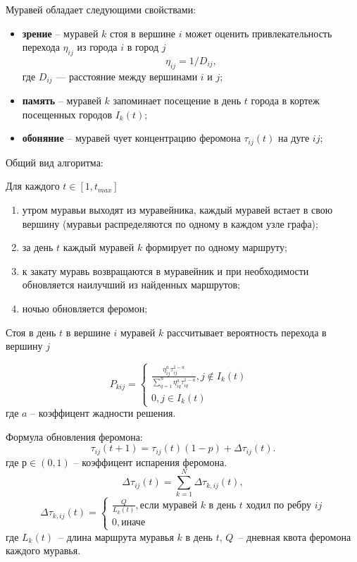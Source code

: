 Муравей обладает следующими свойствами:
\begin{itemize}
	\item \textbf{зрение} -- муравей $k$ стоя в вершине $i$ может оценить привлекательность перехода $\eta_{ij}$ из города $i$ в город $j$
	\begin{equation}
		\eta_{ij} = 1 / D_{ij},
	\end{equation}
	где $D_{ij}$ — расстояние между вершинами $i$ и $j$;
	
	
	\item \textbf{память} -- муравей $k$ запоминает посещение в день $t$ города в кортеж посещенных городов $I_{k}(t)$;
	
	\item \textbf{обоняние} -- муравей чует концентрацию феромона $\tau_{ij}(t)$ на дуге $ij$;
	
\end{itemize}

Общий вид алгоритма: 

Для каждого $t \in [1, t_{max}]$
\begin{enumerate}[label={\arabic*)}]
	\item утром муравьи выходят из муравейника, каждый муравей встает в свою вершину (муравьи распределяются по одному в каждом узле графа);
	\item за день $t$ каждый муравей $k$ формирует по одному маршруту;
	\item к закату муравь возвращаются в муравейник и при необходимости обновляется наилучший из найденных маршрутов;
	\item ночью обновляется феромон;
\end{enumerate}

Стоя в день $t$ в вершине $i$ муравей $k$ рассчитывает вероятность перехода в вершину $j$

\begin{equation}
	P_{kij} = \begin{cases}
		\frac{\eta_{ij}^a\tau_{ij}^{1-a}}{\sum_{q=1}^n \eta^a_{iq}\tau^{1-a}_{iq}}, \textrm{$j \notin I_{k}(t)$ } \\
		0, \textrm{$j \in I_{k}(t)$ }
	\end{cases}
\end{equation}
где $a$ -- коэффицент жадности решения.

Формула обновления феромона:
\begin{equation}
	\tau_{ij}(t+1) = \tau_{ij}(t)(1-p) + \Delta \tau_{ij}(t).
\end{equation}
где $р \in (0, 1)$ -- коэффицент испарения феромона.
\begin{equation}
	\Delta \tau_{ij}(t) = \sum_{k=1}^N \Delta \tau_{k,ij}(t),
\end{equation}
\begin{equation}
	\Delta \tau_{k,ij}(t) = \begin{cases}
		\frac{Q}{L_{k}(t)}, \textrm{если муравей $k$ в день $t$ ходил по ребру $ij$} \\
		0, \textrm{иначе}
	\end{cases}
\end{equation}
где $L_{k}(t)$~-- длина маршрута муравья $k$ в день $t$, $Q$~-- дневная квота феромона каждого муравья.

